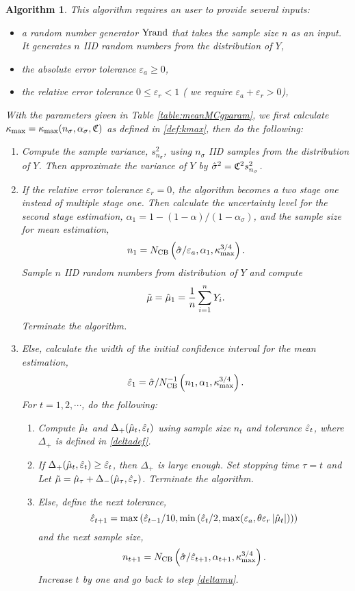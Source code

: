 \documentclass{iitthesis}
\newtheorem{algorithm}[theorem]{Algorithm}
\theoremstyle{definition}
\begin{document}
\begin{algorithm}\label{alg:meanMCg} 
This algorithm requires an user to provide several inputs:
\begin{itemize}
\item a random number generator $\operatorname{Yrand}$ that takes the sample size $n$ as an input. It generates $n$ IID random numbers from the distribution of $Y$,
\item the absolute error tolerance $\varepsilon_a \geq 0$,
\item the relative error tolerance $0 \leq \varepsilon_r <1$ ( we require $\varepsilon_a+\varepsilon_r >0$),
\end{itemize}
With the parameters given in Table \ref{table:meanMCgparam}, we first calculate $\kappa_{\max}=\kappa_{\max}(n_\sigma,\alpha_\sigma,\mathfrak{C})$ as defined in \eqref{def:kmax}, then do the following:
\begin{enumerate}
\item Compute the sample variance, $s^2_{n_{\sigma}}$, using $n_\sigma$ IID samples from the distribution of $Y$. Then approximate the variance of $Y$ by $\hat{\sigma}^2 = \mathfrak{C}^2 s^2_{n_\sigma}$. 
\item If the relative error tolerance $\varepsilon_r=0$, the algorithm becomes a two stage one instead of multiple stage one. Then calculate the uncertainty level for the second stage estimation, $\alpha_1 = 1-(1-\alpha)/(1-\alpha_\sigma)$, and the sample size for mean estimation,
$$n_1 = N_{\operatorname{CB}}\left(\hat{\sigma}/\varepsilon_a,\alpha_1,\kappa_{\max}^{3/4}\right).$$ 
Sample $n$ IID random numbers from distribution of $Y$ and compute $$\tilde{\mu} =\hat{\mu}_1 = \frac1n\sum_{i=1}^nY_i.$$
Terminate the algorithm.
\item Else, calculate the width of the initial confidence interval for the mean estimation,
\begin{align}\label{eps1def}
\hat{\varepsilon}_1=\hat{\sigma} /N_{\operatorname{CB}}^{-1}\left(n_1,\alpha_1,\kappa_{\max}^{3/4}\right).
\end{align}
For $t = 1,2,\cdots$, do the following:
\begin{enumerate}
\item \label{deltamu}Compute $\hat{\mu}_t$ and $\Delta_{+}(\hat{\mu}_t,\hat{\varepsilon}_t)$ using sample size $n_t$ and tolerance $\hat{\varepsilon}_t$, where $\Delta_{+}$ is defined in \eqref{deltadef}.
\item If $\Delta_{+}(\hat{\mu}_t,\hat{\varepsilon}_t) \geq  \hat{\varepsilon}_t$, then $\Delta_{+}$ is large enough. Set stopping time $\tau = t$ and Let $\tilde{\mu} = \hat{\mu}_{\tau}+\Delta_{-}(\hat{\mu}_\tau,\hat{\varepsilon}_\tau)$. Terminate the algorithm.
\item Else, define the next tolerance, $$\hat{\varepsilon}_{t+1} = \max \left ( \hat{\varepsilon}_{t-1}/10,\min\left(\hat{\varepsilon}_t/2, \max(\varepsilon_a,\theta\varepsilon_r\left \lvert \hat{\mu}_t \right \rvert)\right)\right)$$ and the next sample size, $$n_{t+1} = N_{\operatorname{CB}}\left(\hat{\sigma}/\hat{\varepsilon}_{t+1},\alpha_{t+1},\kappa_{\max}^{3/4}\right).$$ Increase $t$ by one and go back to step \eqref{deltamu}. 
\end{enumerate}
\end{enumerate}
\end{algorithm}
\end{document}
